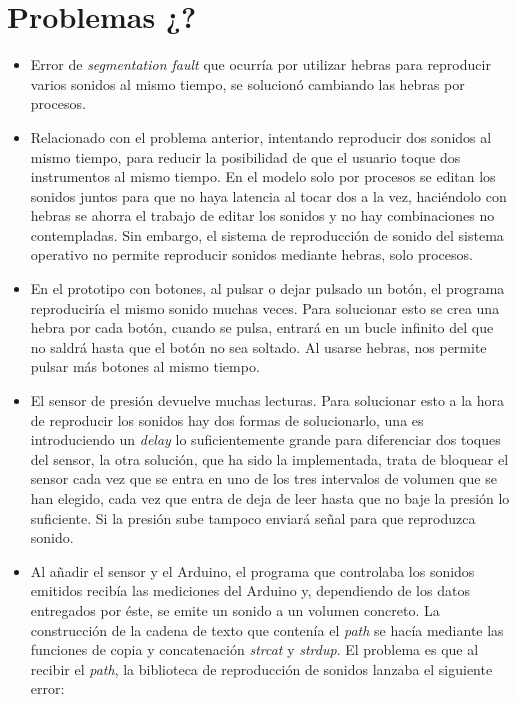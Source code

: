 
    \section{Problemas ¿?} %
    \label{sec:Problemas}

        \begin{itemize}
            \item
            Error de \textit{segmentation fault} que ocurría por utilizar hebras para reproducir
            varios sonidos al mismo tiempo, se solucionó cambiando las hebras por procesos.
            \item
            Relacionado con el problema anterior, intentando reproducir dos sonidos al mismo tiempo, para reducir
            la posibilidad de que el usuario toque dos instrumentos al mismo tiempo. En el modelo solo por procesos
            se editan los sonidos juntos para que no haya latencia al tocar dos a la vez, haciéndolo con hebras se
            ahorra el trabajo de editar los sonidos y no hay combinaciones no contempladas. Sin embargo, el sistema
            de reproducción de sonido del sistema operativo no permite reproducir sonidos mediante hebras, solo
            procesos.
            \item
            En el prototipo con botones, al pulsar o dejar pulsado un botón, el programa reproduciría el mismo
            sonido muchas veces. Para solucionar esto se crea una hebra por cada botón, cuando se pulsa, entrará
            en un bucle infinito del que no saldrá hasta que el botón no sea soltado. Al usarse hebras, nos
            permite pulsar más botones al mismo tiempo.
            \item
            El sensor de presión devuelve muchas lecturas. Para solucionar esto a la hora de reproducir los sonidos
            hay dos formas de solucionarlo, una es introduciendo un \textit{delay} lo suficientemente grande para
            diferenciar dos toques del sensor, la otra solución, que ha sido la implementada, trata de bloquear el
            sensor cada vez que se entra en uno de los tres intervalos de volumen que se han elegido, cada vez que
            entra de deja de leer hasta que no baje la presión lo suficiente. Si la presión sube tampoco enviará
            señal para que reproduzca sonido.
            \item
            Al añadir el sensor y el Arduino, el programa que controlaba los sonidos emitidos recibía las mediciones
            del Arduino y, dependiendo de los datos entregados por éste, se emite un sonido a un volumen concreto.
            La construcción de la cadena de texto que contenía el \textit{path} se hacía mediante las funciones de
            copia y concatenación \textit{strcat} y \textit{strdup}. El problema es que al recibir el \textit{path},
            la biblioteca de reproducción de sonidos lanzaba el siguiente error:


\end{itemize}

